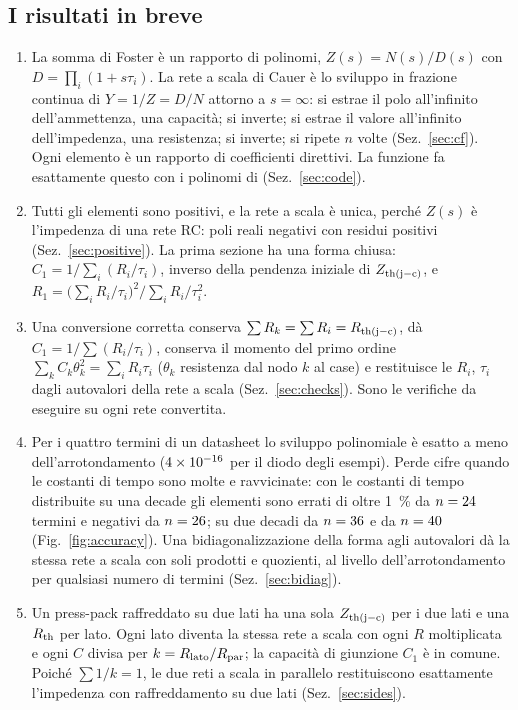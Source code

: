 \documentclass[10pt,a4paper]{scrartcl}
\let\newcommand\fcitdefine
\newcommand{\Zjc}{Z_\mathrm{th(j-c)}}
\newcommand{\Rth}{R_\mathrm{th}}
\newcommand{\Rjc}{R_\mathrm{th(j-c)}}
\newcommand{\Rpar}{R_\mathrm{par}}
\newcommand{\code}[1]{\texttt{#1}}
\begin{document}
\subsection*{I risultati in breve}
\begin{enumerate}
\item La somma di Foster è un rapporto di polinomi, $Z(s) = N(s)/D(s)$ con $D = \prod_i (1+s\tau_i)$. La rete a scala di Cauer è lo sviluppo in frazione continua di $Y = 1/Z = D/N$ attorno a $s = \infty$: si estrae il polo all'infinito dell'ammettenza, una capacità; si inverte; si estrae il valore all'infinito dell'impedenza, una resistenza; si inverte; si ripete $n$ volte (Sez.~\ref{sec:cf}). Ogni elemento è un rapporto di coefficienti direttivi. La funzione fa esattamente questo con i polinomi di  (Sez.~\ref{sec:code}).
\item Tutti gli elementi sono positivi, e la rete a scala è unica, perché $Z(s)$ è l'impedenza di una rete RC: poli reali negativi con residui positivi (Sez.~\ref{sec:positive}). La prima sezione ha una forma chiusa: $C_1 = 1/\sum_i (R_i/\tau_i)$, inverso della pendenza iniziale di $\Zjc$, e $R_1 = \bigl(\sum_i R_i/\tau_i\bigr)^2 \big/ \sum_i R_i/\tau_i^2$.
\item Una conversione corretta conserva $\sum R_k = \sum R_i = \Rjc$, dà $C_1 = 1/\sum (R_i/\tau_i)$, conserva il momento del primo ordine $\sum_k C_k \theta_k^2 = \sum_i R_i\tau_i$ ($\theta_k$ resistenza dal nodo $k$ al case) e restituisce le $R_i$, $\tau_i$ dagli autovalori della rete a scala (Sez.~\ref{sec:checks}). Sono le verifiche da eseguire su ogni rete convertita.
\item Per i quattro termini di un datasheet lo sviluppo polinomiale è esatto a meno dell'arrotondamento ($4\times 10^{-16}$ per il diodo degli esempi). Perde cifre quando le costanti di tempo sono molte e ravvicinate: con le costanti di tempo distribuite su una decade gli elementi sono errati di oltre \SI{1}{\percent} da $n = 24$ termini e negativi da $n = 26$; su due decadi da $n = 36$ e da $n = 40$ (Fig.~\ref{fig:accuracy}). Una bidiagonalizzazione della forma agli autovalori dà la stessa rete a scala con soli prodotti e quozienti, al livello dell'arrotondamento per qualsiasi numero di termini (Sez.~\ref{sec:bidiag}).
\item Un press-pack raffreddato su due lati ha una sola $\Zjc$ per i due lati e una $\Rth$ per lato. Ogni lato diventa la stessa rete a scala con ogni $R$ moltiplicata e ogni $C$ divisa per $k = R_\mathrm{lato}/\Rpar$; la capacità di giunzione $C_1$ è in comune. Poiché $\sum 1/k = 1$, le due reti a scala in parallelo restituiscono esattamente l'impedenza con raffreddamento su due lati (Sez.~\ref{sec:sides}).

\end{enumerate}
\end{document}
